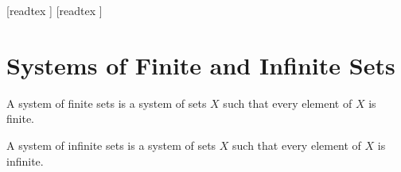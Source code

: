 \documentclass[10pt]{article}
\begin{document}
  \begin{imports}
    \begin{forthel}
      [readtex ]
      [readtex ]
    \end{forthel}
  \end{imports}


  \section*{Systems of Finite and Infinite Sets}

  \begin{forthel}
    \begin{definition}
      A system of finite sets is a system of sets $X$ such that every element of $X$ is finite.
    \end{definition}
  \end{forthel}

  \begin{forthel}
    \begin{definition}
      A system of infinite sets is a system of sets $X$ such that every element of $X$ is infinite.
    \end{definition}
  \end{forthel}
\end{document}
